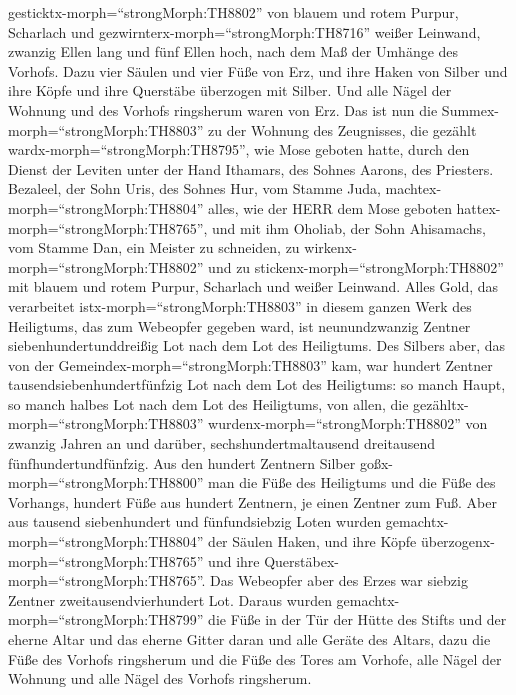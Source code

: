 gesticktx-morph=``strongMorph:TH8802'' von blauem und rotem Purpur,
Scharlach und gezwirnterx-morph=``strongMorph:TH8716'' weißer Leinwand,
zwanzig Ellen lang und fünf Ellen hoch, nach dem Maß der Umhänge des
Vorhofs.  Dazu vier Säulen und vier Füße von Erz, und ihre
Haken von Silber und ihre Köpfe und ihre Querstäbe überzogen mit Silber.
 Und alle Nägel der Wohnung und des Vorhofs ringsherum
waren von Erz.  Das ist nun die
Summex-morph=``strongMorph:TH8803'' zu der Wohnung des Zeugnisses, die
gezählt wardx-morph=``strongMorph:TH8795'', wie Mose geboten hatte,
durch den Dienst der Leviten unter der Hand Ithamars, des Sohnes Aarons,
des Priesters.  Bezaleel, der Sohn Uris, des Sohnes Hur,
vom Stamme Juda, machtex-morph=``strongMorph:TH8804'' alles, wie der
HERR dem Mose geboten hattex-morph=``strongMorph:TH8765'', 
und mit ihm Oholiab, der Sohn Ahisamachs, vom Stamme Dan, ein Meister zu
schneiden, zu wirkenx-morph=``strongMorph:TH8802'' und zu
stickenx-morph=``strongMorph:TH8802'' mit blauem und rotem Purpur,
Scharlach und weißer Leinwand.  Alles Gold, das verarbeitet
istx-morph=``strongMorph:TH8803'' in diesem ganzen Werk des Heiligtums,
das zum Webeopfer gegeben ward, ist neunundzwanzig Zentner
siebenhundertunddreißig Lot nach dem Lot des Heiligtums. 
Des Silbers aber, das von der Gemeindex-morph=``strongMorph:TH8803''
kam, war hundert Zentner tausendsiebenhundertfünfzig Lot nach dem Lot
des Heiligtums:  so manch Haupt, so manch halbes Lot nach
dem Lot des Heiligtums, von allen, die
gezähltx-morph=``strongMorph:TH8803''
wurdenx-morph=``strongMorph:TH8802'' von zwanzig Jahren an und darüber,
sechshundertmaltausend dreitausend fünfhundertundfünfzig. 
Aus den hundert Zentnern Silber goßx-morph=``strongMorph:TH8800'' man
die Füße des Heiligtums und die Füße des Vorhangs, hundert Füße aus
hundert Zentnern, je einen Zentner zum Fuß.  Aber aus
tausend siebenhundert und fünfundsiebzig Loten wurden
gemachtx-morph=``strongMorph:TH8804'' der Säulen Haken, und ihre Köpfe
überzogenx-morph=``strongMorph:TH8765'' und ihre
Querstäbex-morph=``strongMorph:TH8765''.  Das Webeopfer
aber des Erzes war siebzig Zentner zweitausendvierhundert Lot.
 Daraus wurden gemachtx-morph=``strongMorph:TH8799'' die
Füße in der Tür der Hütte des Stifts und der eherne Altar und das eherne
Gitter daran und alle Geräte des Altars,  dazu die Füße des
Vorhofs ringsherum und die Füße des Tores am Vorhofe, alle Nägel der
Wohnung und alle Nägel des Vorhofs ringsherum.

